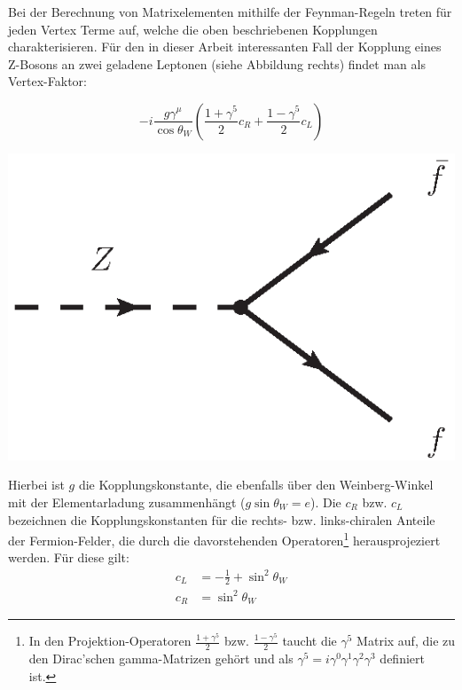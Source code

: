 Bei der Berechnung von Matrixelementen mithilfe der Feynman-Regeln treten
für jeden Vertex Terme auf, welche die oben beschriebenen Kopplungen
charakterisieren. Für den in dieser Arbeit interessanten Fall der Kopplung
eines Z-Bosons an zwei geladene Leptonen (siehe Abbildung
rechts) findet man als Vertex-Faktor: \\
\begin{minipage}{0.6\textwidth}
\begin{equation}
    -i \frac{g\gamma^\mu}{\cos\theta_W} \left( \frac{1+\gamma^5}{2} c_R
        + \frac{1-\gamma^5}{2} c_L \right)
    \label{eq:coupling}
\end{equation}
\end{minipage}
\hfill
\begin{minipage}{0.3\textwidth}
    \includegraphics[width=1.0\textwidth]{img/NCvertex}
\end{minipage}
\newline

Hierbei ist $g$ die Kopplungskonstante, die ebenfalls über den Weinberg-Winkel
mit der Elementarladung zusammenhängt ($g\sin\theta_W=e$). Die $c_R$ bzw.
$c_L$ bezeichnen die Kopplungskonstanten für die rechts- bzw. links-chiralen
Anteile der Fermion-Felder, die durch die davorstehenden Operatoren\footnote{In
den Projektion-Operatoren $\frac{1+\gamma^5}{2}$ bzw. $\frac{1-\gamma^5}{2}$
taucht die $\gamma^5$ Matrix auf, die zu den Dirac'schen gamma-Matrizen gehört
und als $\gamma^5=i\gamma^0\gamma^1\gamma^2\gamma^3$ definiert ist.}
herausprojeziert werden. Für diese gilt:
\begin{align}
    c_L &= - \frac{1}{2} + \sin^2\theta_W   \\
    c_R &= \sin^2\theta_W
\end{align}

